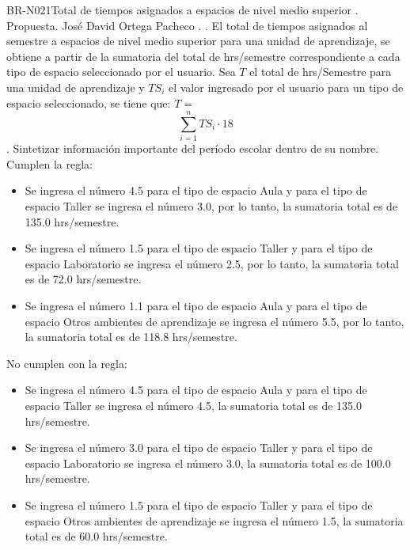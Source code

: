 \begin{BusinessRule}{BR-N021}{Total de tiempos asignados a espacios de nivel medio superior}
	{\bcIntegridad}    %
	{\btTimer}     %
	{\blControlling}    %
	.
	\BRItem[Estado] Propuesta.
	 José David Ortega Pacheco
	 .
	 .
	\BRItem[Descripción] El total de tiempos asignados al semestre a espacios de nivel medio superior para una unidad de aprendizaje, se obtiene a partir de la sumatoria del total de hrs/semestre correspondiente a cada tipo de espacio seleccionado por el usuario.
	\BRItem[Sentencia] Sea $T$ el total de hrs/Semestre para una unidad de aprendizaje y $TS_{i}$ el valor ingresado por el usuario para un tipo de espacio seleccionado, se tiene que: $T=$\[\sum_{i=1}^{n}TS_{i}\cdot18\].
	\BRItem[Motivación] Sintetizar información importante del período escolar dentro de su nombre.
	 Cumplen la regla:
		\begin{itemize}
			\item Se ingresa el número 4.5 para el tipo de espacio Aula y para el tipo de espacio Taller se ingresa el número 3.0, por lo tanto, la sumatoria total es de 135.0 hrs/semestre.
			\item Se ingresa el número 1.5 para el tipo de espacio Taller y para el tipo de espacio Laboratorio se ingresa el número 2.5, por lo tanto, la sumatoria total es de 72.0 hrs/semestre.
			\item Se ingresa el número 1.1 para el tipo de espacio Aula y para el tipo de espacio Otros ambientes de aprendizaje se ingresa el número 5.5, por lo tanto, la sumatoria total es de 118.8 hrs/semestre.
		\end{itemize}
	 No cumplen con la regla:
		\begin{itemize}
			\item Se ingresa el número 4.5 para el tipo de espacio Aula y para el tipo de espacio Taller se ingresa el número 4.5, la sumatoria total es de 135.0 hrs/semestre.
			\item Se ingresa el número 3.0 para el tipo de espacio Taller y para el tipo de espacio Laboratorio se ingresa el número 3.0, la sumatoria total es de 100.0 hrs/semestre.
			\item Se ingresa el número 1.5 para el tipo de espacio Taller y para el tipo de espacio Otros ambientes de aprendizaje se ingresa el número 1.5, la sumatoria total es de 60.0 hrs/semestre.
		\end{itemize}
\end{BusinessRule}

